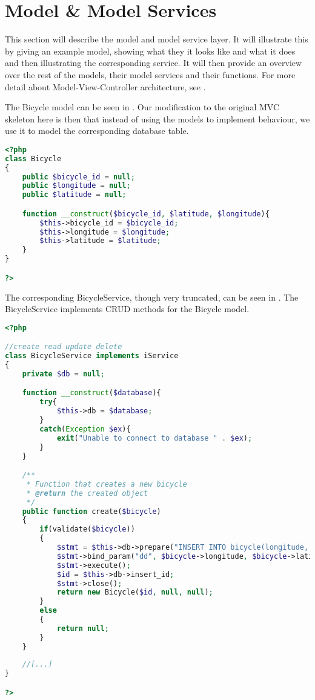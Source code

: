 \section{Model \& Model Services}
This section will describe the model and model service layer.
It will illustrate this by giving an example model, showing what they it looks like and what it does and then illustrating the corresponding service.
It will then provide an overview over the rest of the models, their model services and their functions.
For more detail about Model-View-Controller architecture, see .

The Bicycle model can be seen in . Our modification to the original MVC skeleton here is then that instead of using the models to implement behaviour, we use it to model the corresponding database table.

\begin{minipage}{\textwidth}
\begin{lstlisting}[language=php, label=lst:bicycleModel, caption={Bicycle Class}]
<?php
class Bicycle
{
    public $bicycle_id = null;
    public $longitude = null;
    public $latitude = null;

    function __construct($bicycle_id, $latitude, $longitude){
        $this->bicycle_id = $bicycle_id;
        $this->longitude = $longitude;
        $this->latitude = $latitude;
    }
}

?>
\end{lstlisting}
\end{minipage}

The corresponding BicycleService, though very truncated, can be seen in . The BicycleService implements CRUD methods for the Bicycle model.

\begin{lstlisting}[language=php, label=lst:bicycleService, caption={BicycleService Class}]
<?php

//create read update delete
class BicycleService implements iService
{
    private $db = null;

    function __construct($database){
        try{
            $this->db = $database;
        }
        catch(Exception $ex){
            exit("Unable to connect to database " . $ex);
        }
    }

    /**
     * Function that creates a new bicycle
     * @return the created object
     */
    public function create($bicycle)
    {
        if(validate($bicycle))
        {
            $stmt = $this->db->prepare("INSERT INTO bicycle(longitude, latitude) VALUES (?,?)");
            $stmt->bind_param("dd", $bicycle->longitude, $bicycle->latitude);
            $stmt->execute();
            $id = $this->db->insert_id;
            $stmt->close();
            return new Bicycle($id, null, null);
        }
        else
        {
            return null;
        }
    }
    
    //[...]
}

?>
\end{lstlisting}


